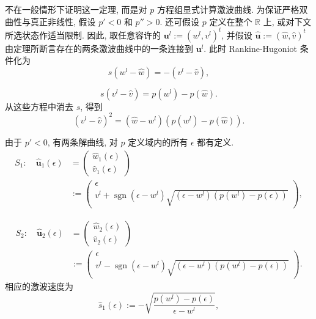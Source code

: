 不在一般情形下证明这一定理, 而是对 $p$ 方程组显式计算激波曲线. 为保证严格双曲性与真正非线性, 假设 $p'<0$ 和 $p''>0$. 还可假设 $p$ 定义在整个 $\mathbb{R}$ 上, 或对下文所选状态作适当限制. 因此, 取任意容许的 $\bm{u}^l:=(w^l,v^l)^t$, 并假设 $\hat{\bm{u}}:=(\hat w,\hat v)^t$ 由定理所断言存在的两条激波曲线中的一条连接到 $\bm{u}^l$. 此时 Rankine-Hugoniot 条件化为
\begin{equation}\label{eq:p-system-shock-volume-rh}
s(w^l-\hat w)=-(v^l-\hat v),
\end{equation}

\begin{equation}\label{eq:p-system-shock-velocity-rh}
s(v^l-\hat v)=p(w^l)-p(\hat w).
\end{equation}
从这些方程中消去 $s$, 得到
\begin{equation}\label{eq:p-system-shock-eliminated-speed}
(v^l-\hat v)^2=(\hat w-w^l)(p(w^l)-p(\hat w)).
\end{equation}


由于 $p'<0$, 有两条解曲线, 对 $p$ 定义域内的所有 $\epsilon$ 都有定义.
\begin{equation}\label{eq:p-system-first-shock-curve}
\begin{aligned}
S_1:\quad\hat{\bm{u}}_1(\epsilon)&=\begin{pmatrix}\hat w_1(\epsilon)\\\hat v_1(\epsilon)\end{pmatrix}\\
&:=\begin{pmatrix}\epsilon\\v^l+\operatorname{sgn}(\epsilon-w^l)\sqrt{(\epsilon-w^l)(p(w^l)-p(\epsilon))}\end{pmatrix},
\end{aligned}
\end{equation}

\begin{equation}\label{eq:p-system-second-shock-curve}
\begin{aligned}
S_2:\quad\hat{\bm{u}}_2(\epsilon)&=\begin{pmatrix}\hat w_2(\epsilon)\\\hat v_2(\epsilon)\end{pmatrix}\\
&:=\begin{pmatrix}\epsilon\\v^l-\operatorname{sgn}(\epsilon-w^l)\sqrt{(\epsilon-w^l)(p(w^l)-p(\epsilon))}\end{pmatrix}.
\end{aligned}
\end{equation}
相应的激波速度为
\begin{equation}\label{eq:p-system-first-shock-curve-speed}
\hat s_1(\epsilon):=-\sqrt{\dfrac{p(w^l)-p(\epsilon)}{\epsilon-w^l}},
\end{equation}

